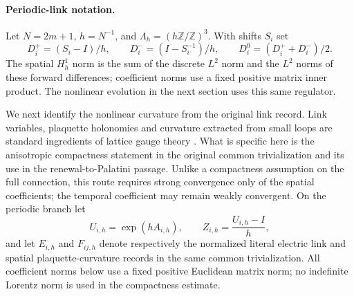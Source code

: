 \documentclass[11pt]{article}
\numberwithin{equation}{section}
\theoremstyle{definition}
\theoremstyle{remark}
\begin{document}
\paragraph{Periodic-link notation.}
Let $N=2m+1$, $h=N^{-1}$, and
$\Lambda_h=(h\mathbb Z/\mathbb Z)^3$.  With shifts $S_i$ set
\begin{equation}
 D_i^+=(S_i-I)/h,\qquad D_i^-=(I-S_i^{-1})/h,\qquad
 D_i^0=(D_i^++D_i^-)/2.
 \label{eq:main-open-differences}
\end{equation}
The spatial $H_h^1$ norm is the sum of the discrete $L^2$ norm and the
$L^2$ norms of these forward differences; coefficient norms use a fixed
positive matrix inner product. The nonlinear evolution in the next section
uses this same regulator.

\label{subsec:main-literal-link-compactness}

We next identify the nonlinear curvature from the original link record.
Link variables, plaquette holonomies and curvature extracted from small loops
are standard ingredients of lattice gauge theory \cite{Wilson1974}.  What is
specific here is the anisotropic compactness statement in the original common
trivialization and its use in the renewal-to-Palatini passage.  Unlike a
compactness assumption on the full connection, this route requires strong
convergence only of the spatial coefficients; the temporal coefficient may
remain weakly convergent. On the periodic branch let
\begin{equation}
 U_{i,h}=\exp(hA_{i,h}),\qquad
 Z_{i,h}=\frac{U_{i,h}-I}{h},
 \label{eq:main-link-coordinate}
\end{equation}
and let $E_{i,h}$ and $F_{ij,h}$ denote respectively the normalized literal
electric link and spatial plaquette-curvature records in the same common
trivialization.  All coefficient norms below use a fixed positive Euclidean
matrix norm; no indefinite Lorentz norm is used in the compactness estimate.
\end{document}
